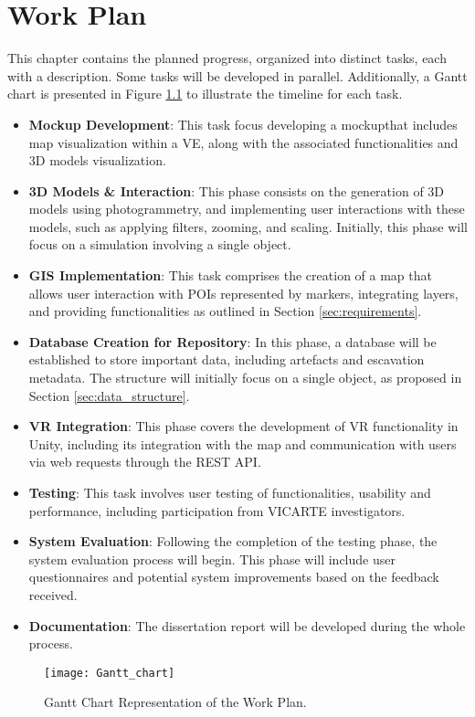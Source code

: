 
%

\chapter{Work Plan}
\label{cha:work_plan}

This chapter contains the planned progress, organized into distinct tasks, each with a description. Some tasks will be developed in parallel. 
Additionally, a Gantt chart is presented in Figure \ref{fig:gantt_chart} to illustrate the timeline for each task.

\begin{itemize}
    \item \textbf{Mockup Development}: This task focus developing a mockupthat includes map visualization within a \gls{VE}, along with the associated functionalities and \gls{3D} models visualization.
    \item \textbf{\gls{3D} Models \& Interaction}: This phase consists on the generation of \gls{3D} models using photogrammetry, and implementing user interactions with these models, such as applying filters, zooming, and scaling.  Initially, this phase will focus on a simulation involving a single object.
    \item \textbf{\gls{GIS} Implementation}: This task comprises the creation of a map that allows user interaction with \glspl{POI} represented by markers, integrating layers, and providing functionalities as outlined in Section \ref{sec:requirements}.
    \item \textbf{Database Creation for Repository}: In this phase, a database will be established to store important data, including artefacts and escavation metadata. The structure will initially focus on a single object, as proposed in Section \ref{sec:data_structure}.
    \item \textbf{\gls{VR} Integration}: This phase covers the development of \gls{VR} functionality in Unity, including its integration with the map and communication with users via web requests through the REST API.
    \item \textbf{Testing}: This task involves user testing of functionalities, usability and performance, including participation from VICARTE investigators.
    \item \textbf{System Evaluation}: Following the completion of the testing phase, the system evaluation process will begin. This phase will include user questionnaires and potential system improvements based on the feedback received. 
    \item \textbf{Documentation}: The dissertation report will be developed during the whole process.
\end{itemize}

\begin{figure}[h!]
    \centering
    \texttt{[image: Gantt\_chart]}
    \caption{Gantt Chart Representation of the Work Plan.}
    \label{fig:gantt_chart}
  \end{figure}
  \FloatBarrier
